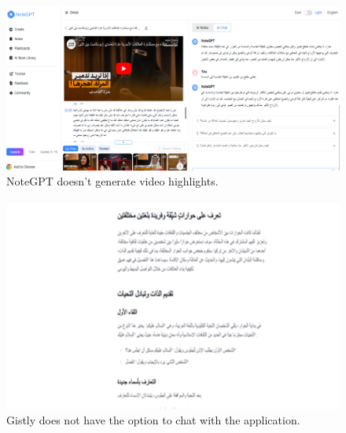 \documentclass{bscs}
\begin{document}
\begin{figure}[h]
    \centering
    \includegraphics[width=1.1\textwidth]{figure_e.png}  
    \caption[NoteGPT Limitations]{NoteGPT doesn't generate video highlights.}
    \label{fig:notegpt_limitations}
\end{figure}

\begin{figure}[h]
    \centering
    \includegraphics[width=1.1\textwidth]{figure_d.png}  
    \caption[Gistly Limitations]{Gistly does not have the option to chat with the application.}
    \label{fig:gistly_limitations}
\end{figure}
\end{document}
